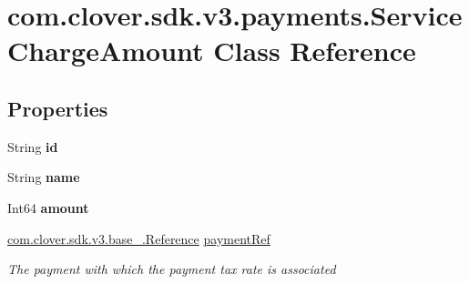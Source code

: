 \hypertarget{classcom_1_1clover_1_1sdk_1_1v3_1_1payments_1_1_service_charge_amount}{}\section{com.\+clover.\+sdk.\+v3.\+payments.\+Service\+Charge\+Amount Class Reference}
\label{classcom_1_1clover_1_1sdk_1_1v3_1_1payments_1_1_service_charge_amount}
\subsection*{Properties}
\begin{DoxyCompactItemize}
\item 
\mbox{\label{classcom_1_1clover_1_1sdk_1_1v3_1_1payments_1_1_service_charge_amount_aec20c03cbeee3175ae6a00b0ce5d2701}} 
String {\bfseries id}
\item 
\mbox{\label{classcom_1_1clover_1_1sdk_1_1v3_1_1payments_1_1_service_charge_amount_a92dcb5c471464f498996215f5ed4e9dd}} 
String {\bfseries name}
\item 
\mbox{\label{classcom_1_1clover_1_1sdk_1_1v3_1_1payments_1_1_service_charge_amount_ae3bea9ffeb629a43756f9e5130b5e9b6}} 
Int64 {\bfseries amount}
\item 
\hyperlink{classcom_1_1clover_1_1sdk_1_1v3_1_1base___1_1_reference}{com.\+clover.\+sdk.\+v3.\+base\+\_\+.\+Reference} \hyperlink{classcom_1_1clover_1_1sdk_1_1v3_1_1payments_1_1_service_charge_amount_a374695852cc1abe23dab037151f76b47}{payment\+Ref}
\begin{DoxyCompactList}\small\item\em The payment with which the payment tax rate is associated \end{DoxyCompactList}\end{DoxyCompactItemize}



